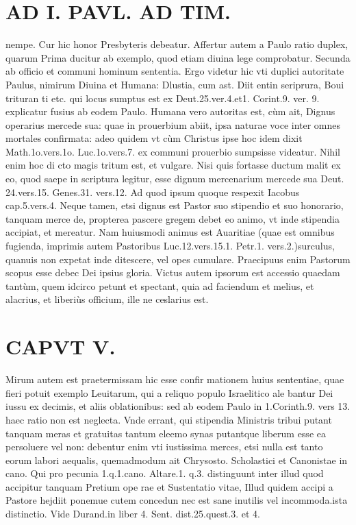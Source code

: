 \documentclass{article}
\begin{document}
\begin{pages}
\section*{AD I. PAVL. AD TIM. }
\marginpar{[ p.310 ]}\pstart nempe. Cur hic honor Presbyteris debeatur. Affertur autem a Paulo ratio duplex, quarum Prima ducitur ab exemplo, quod etiam diuina lege comprobatur. Secunda ab officio et communi hominum sententia. Ergo videtur hic vti duplici autoritate Paulus, nimirum Diuina et Humana: Dlustia, cum ast. Diit entin seriprura, Boui trituran ti etc. qui locus sumptus est ex Deut.25.ver.4.et1. Corint.9. ver. 9. explicatur fusius ab eodem Paulo.  \pend\pstart Humana vero autoritas est, cùm ait, Dignus operarius mercede sua: quae in prouerbium abiit, ipsa naturae voce inter omnes mortales confirmata: adeo quidem vt cùm Christus ipse hoc idem dixit Math.1o.vers.1o. Luc.1o.vers.7. ex communi prouerbio sumpsisse videatur. Nihil enim hoc di cto magis tritum est, et vulgare. Nisi quis fortasse ductum malit ex eo, quod saepe in scriptura legitur, esse dignum mercenarium mercede sua Deut. 24.vers.15. Genes.31. vers.12. Ad quod ipsum quoque respexit Iacobus cap.5.vers.4.  \pend\pstart Neque tamen, etsi dignus est Pastor suo stipendio et suo honorario, tanquam merce de, propterea pascere gregem debet eo animo, vt inde stipendia accipiat, et mereatur. Nam huiusmodi animus est Auaritiae (quae est omnibus fugienda, imprimis autem Pastoribus Luc.12.vers.15.1. Petr.1. vers.2.)surculus, quanuis non expetat inde ditescere, vel opes cumulare. Praecipuus enim Pastorum scopus esse debec Dei ipsius gloria. Victus autem ipsorum est accessio quaedam tantùm, quem idcirco petunt et spectant, quia ad faciendum et melius, et alacrius, et liberiùs officium, ille ne ceslarius est.  \pend
\section*{CAPVT V. }
\marginpar{[ p.31 ]}\pstart Mirum autem est praetermissam hic esse confir mationem huius sententiae, quae fieri potuit exemplo Leuitarum, qui a reliquo populo Israelitico ale bantur Dei iussu ex decimis, et aliis oblationibus: sed ab eodem Paulo in 1.Corinth.9. vers 13. haec ratio non est neglecta.  \pend\pstart Vnde errant, qui stipendia Ministris tribui putant tanquam meras et gratuitas tantum eleemo synas putantque  liberum esse ea persoluere vel non: debentur enim vti iustissima merces, etsi nulla est tanto eorum labori aequalis, quemadmodum ait Chrysosto. Scholastici et Canonistae in cano. Qui pro pecunia 1.q.1.cano. Altare.1. q.3. distinguunt inter illud quod accipitur tanquam Pretium ope rae et Sustentatio vitae, Illud quidem accipi a Pastore hejdiit ponemue cutem concedun nec est sane inutilis vel incommoda.ista distinctio. Vide Durand.in liber 4. Sent. dist.25.quest.3. et 4.  \pend
{}
{}

\end{pages}
\end{document}
